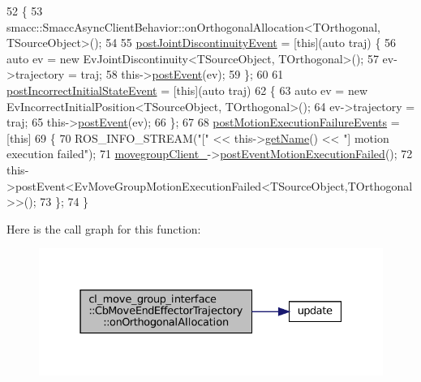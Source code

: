 \begin{DoxyCode}
52     \{
53       smacc::SmaccAsyncClientBehavior::onOrthogonalAllocation<TOrthogonal, TSourceObject>();
54 
55       \hyperlink{classcl__move__group__interface_1_1CbMoveEndEffectorTrajectory_a308331beab9b2ec0eae72fa56fa999c9}{postJointDiscontinuityEvent} = [\textcolor{keyword}{this}](\textcolor{keyword}{auto} traj) \{
56         \textcolor{keyword}{auto} ev = \textcolor{keyword}{new} EvJointDiscontinuity<TSourceObject, TOrthogonal>();
57         ev->trajectory = traj;
58         this->\hyperlink{classsmacc_1_1ISmaccClientBehavior_a5db577c585935114058770f2b7242f8a}{postEvent}(ev);
59       \};
60 
61       \hyperlink{classcl__move__group__interface_1_1CbMoveEndEffectorTrajectory_a6180230347c922fa0d85f514ce5029df}{postIncorrectInitialStateEvent} = [\textcolor{keyword}{this}](\textcolor{keyword}{auto} traj) 
62       \{
63         \textcolor{keyword}{auto} ev = \textcolor{keyword}{new} EvIncorrectInitialPosition<TSourceObject, TOrthogonal>();
64         ev->trajectory = traj;
65         this->\hyperlink{classsmacc_1_1ISmaccClientBehavior_a5db577c585935114058770f2b7242f8a}{postEvent}(ev);
66       \};
67 
68       \hyperlink{classcl__move__group__interface_1_1CbMoveEndEffectorTrajectory_a72c4a469b70617dc5ea75e225a013582}{postMotionExecutionFailureEvents} = [\textcolor{keyword}{this}]
69       \{
70           ROS\_INFO\_STREAM(\textcolor{stringliteral}{"["} << this->\hyperlink{classsmacc_1_1ISmaccClientBehavior_a18e4bec9460b010f2894c0f7e7064a34}{getName}() << \textcolor{stringliteral}{"] motion execution failed"});
71           \hyperlink{classcl__move__group__interface_1_1CbMoveEndEffectorTrajectory_aea650d3e7836125b32be97392b71a7f3}{movegroupClient\_}->\hyperlink{classcl__move__group__interface_1_1ClMoveGroup_a39dc3871d29b2af1ab739057f6ca6daa}{postEventMotionExecutionFailed}();
72           this->postEvent<EvMoveGroupMotionExecutionFailed<TSourceObject,TOrthogonal>>();
73       \};
74     \}    
\end{DoxyCode}
Here is the call graph for this function\+:
\nopagebreak
\begin{figure}[H]
\begin{center}
\leavevmode
\includegraphics[width=331pt]{classcl__move__group__interface_1_1CbMoveEndEffectorTrajectory_aae4797fba54cb3bf371cc67d26a82186_cgraph}
\end{center}
\end{figure}
